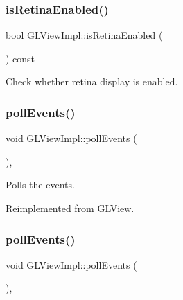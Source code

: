 \subsubsection{\texorpdfstring{is\+Retina\+Enabled()}{isRetinaEnabled()}\hspace{0.1cm}{\footnotesize\ttfamily [2/2]}}
{\footnotesize\ttfamily bool G\+L\+View\+Impl\+::is\+Retina\+Enabled (\begin{DoxyParamCaption}{ }\end{DoxyParamCaption}) const\hspace{0.3cm}{\ttfamily [inline]}}

Check whether retina display is enabled. \mbox{\label{classGLViewImpl_aafbe949f616506c1faeb090fe9456bcc}} 
\subsubsection{\texorpdfstring{poll\+Events()}{pollEvents()}\hspace{0.1cm}{\footnotesize\ttfamily [1/2]}}
{\footnotesize\ttfamily void G\+L\+View\+Impl\+::poll\+Events (\begin{DoxyParamCaption}{ }\end{DoxyParamCaption})\hspace{0.3cm}{\ttfamily [override]}, {\ttfamily [virtual]}}

Polls the events. 

Reimplemented from \hyperlink{classGLView_a707854960055e05a3841d4b8cf88f9ce}{G\+L\+View}.

\mbox{\label{classGLViewImpl_aafbe949f616506c1faeb090fe9456bcc}} 
\subsubsection{\texorpdfstring{poll\+Events()}{pollEvents()}\hspace{0.1cm}{\footnotesize\ttfamily [2/2]}}
{\footnotesize\ttfamily void G\+L\+View\+Impl\+::poll\+Events (\begin{DoxyParamCaption}{ }\end{DoxyParamCaption})\hspace{0.3cm}{\ttfamily [override]}, {\ttfamily [virtual]}}

